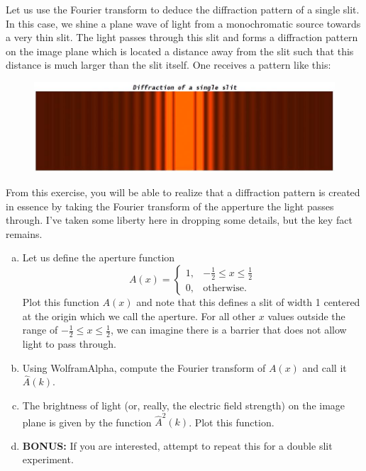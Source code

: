 \documentclass[12pt]{amsbook}
\begin{document}
\newpage
\begin{problem}
Let us use the Fourier transform to deduce the diffraction pattern of a single slit. In this case, we shine a plane wave of light from a monochromatic source towards a very thin slit. The light passes through this slit and forms a diffraction pattern on the image plane which is located a distance away from the slit such that this distance is much larger than the slit itself. One receives a pattern like this:
\begin{figure}[H]
    \centering
    \includegraphics[width=.6\textwidth]{single_slit.jpg}
\end{figure}
From this exercise, you will be able to realize that a diffraction pattern is created in essence by taking the Fourier transform of the apperture the light passes through. I've taken some liberty here in dropping some details, but the key fact remains.
\begin{enumerate}[(a)]
    \item Let us define the aperture function
    \[
    A(x) = \begin{cases} 1, & -\frac{1}{2} \leq x \leq \frac{1}{2}\\
    0, &\textrm{otherwise}.
    \end{cases}
    \]
    Plot this function $A(x)$ and note that this defines a slit of width 1 centered at the origin which we call the aperture. For all other $x$ values outside the range of $-\frac{1}{2} \leq x \leq \frac{1}{2}$, we can imagine there is a barrier that does not allow light to pass through.
    \item Using WolframAlpha, compute the Fourier transform of $A(x)$ and call it $\hat{A}(k)$.
    \item The brightness of light (or, really, the electric field strength) on the image plane is given by the function $\hat{A}^2(k)$. Plot this function. %
    \item \textbf{BONUS:} If you are interested, attempt to repeat this for a double slit experiment.
\end{enumerate}
\end{problem}
\end{document}
